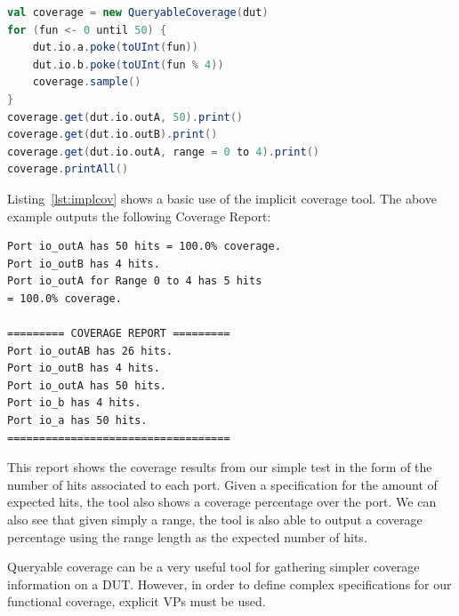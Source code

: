 \documentclass[conference]{IEEEtran}
\begin{document}
\begin{lstlisting}[captionpos=b,caption={Example use of Queryable coverage in order to gain information about the DUT's testing process. Note that \texttt{outA} and \texttt{outB} simply output the values of \texttt{a} and \texttt{b}.},label={lst:implcov},language=scala]
val coverage = new QueryableCoverage(dut)
for (fun <- 0 until 50) {
    dut.io.a.poke(toUInt(fun))
    dut.io.b.poke(toUInt(fun % 4))
    coverage.sample()
}
coverage.get(dut.io.outA, 50).print()
coverage.get(dut.io.outB).print()
coverage.get(dut.io.outA, range = 0 to 4).print()
coverage.printAll()
\end{lstlisting}
Listing~\ref{lst:implcov} shows a basic use of the implicit coverage tool. 
The above example outputs the following Coverage Report:  
\begin{verbatim}
Port io_outA has 50 hits = 100.0% coverage.
Port io_outB has 4 hits.
Port io_outA for Range 0 to 4 has 5 hits 
= 100.0% coverage.  

========= COVERAGE REPORT ========= 
Port io_outAB has 26 hits.
Port io_outB has 4 hits.
Port io_outA has 50 hits.
Port io_b has 4 hits.
Port io_a has 50 hits.
===================================
\end{verbatim}
This report shows the coverage results from our simple test in the form of the number of hits associated to each port.
Given a specification for the amount of expected hits, the tool also shows a coverage percentage over the port.
We can also see that given simply a range, the tool is also able to output a coverage percentage using the range length as the expected number of hits.

Queryable coverage can be a very useful tool for gathering simpler coverage information on a DUT.
However, in order to define complex specifications for our functional coverage, explicit VPs must be used.
\end{document}
